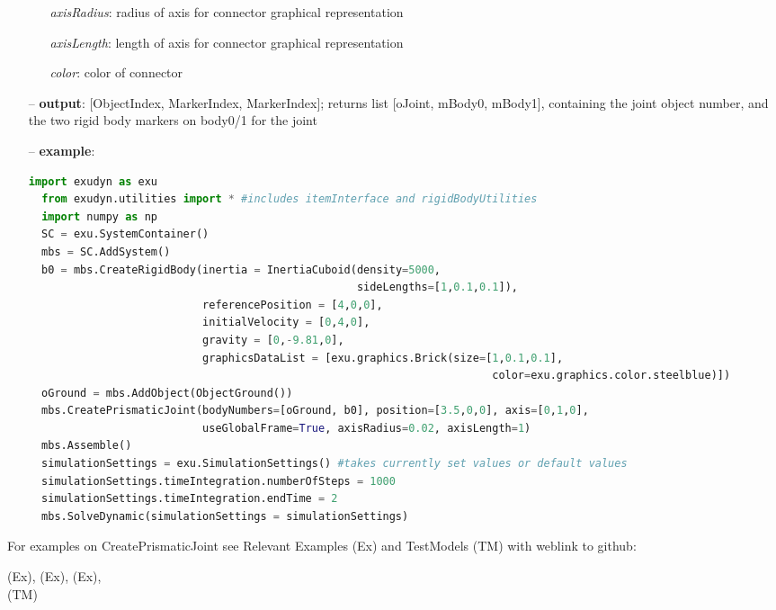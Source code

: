 \begin{itemize}[leftmargin=0.7cm]
\begin{itemize}[leftmargin=1.2cm]
\item[]{\it axisRadius}: radius of axis for connector graphical representation
\item[]{\it axisLength}: length of axis for connector graphical representation
\item[]{\it color}: color of connector
\end{itemize}
\item[--]
{\bf output}: [ObjectIndex, MarkerIndex, MarkerIndex]; returns list [oJoint, mBody0, mBody1], containing the joint object number, and the two rigid body markers on body0/1 for the joint
\item[--]
{\bf example}: \vspace{-12pt}\ei\begin{lstlisting}[language=Python, xleftmargin=36pt]
  import exudyn as exu
  from exudyn.utilities import * #includes itemInterface and rigidBodyUtilities
  import numpy as np
  SC = exu.SystemContainer()
  mbs = SC.AddSystem()
  b0 = mbs.CreateRigidBody(inertia = InertiaCuboid(density=5000,
                                                   sideLengths=[1,0.1,0.1]),
                           referencePosition = [4,0,0],
                           initialVelocity = [0,4,0],
                           gravity = [0,-9.81,0],
                           graphicsDataList = [exu.graphics.Brick(size=[1,0.1,0.1],
                                                                        color=exu.graphics.color.steelblue)])
  oGround = mbs.AddObject(ObjectGround())
  mbs.CreatePrismaticJoint(bodyNumbers=[oGround, b0], position=[3.5,0,0], axis=[0,1,0],
                           useGlobalFrame=True, axisRadius=0.02, axisLength=1)
  mbs.Assemble()
  simulationSettings = exu.SimulationSettings() #takes currently set values or default values
  simulationSettings.timeIntegration.numberOfSteps = 1000
  simulationSettings.timeIntegration.endTime = 2
  mbs.SolveDynamic(simulationSettings = simulationSettings)
\end{lstlisting}\vspace{-24pt}\bi\item[]\vspace{-24pt}\vspace{12pt}\end{itemize}
%

%
\noindent For examples on CreatePrismaticJoint see Relevant Examples (Ex) and TestModels (TM) with weblink to github:
\bi
 \item \footnotesize {} (Ex), 
 (Ex), 
 (Ex), 
\\  (TM)
\ei

